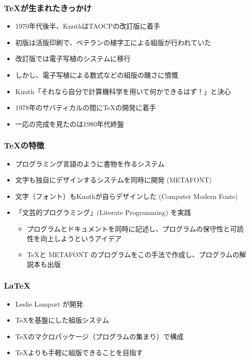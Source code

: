 \documentclass[dvipdfmx]{beamer}
\begin{document}
\begin{frame}
    \frametitle{\TeX が生まれたきっかけ \cite{tex-wikipedia}}
    \large
    \begin{itemize}
        \item<1-> 1970年代後半、KnuthはTAOCPの改訂版に着手
        \item<2-> 初版は活版印刷で、ベテランの植字工による組版が行われていた
        \item<3-> 改訂版では電子写植のシステムに移行
        \item<4-> しかし、電子写植による数式などの組版の醜さに憤慨
        \item<5-> Knuth「それなら自分で計算機科学を用いて何かできるはず！」と決心
        \item<6-> 1978年のサバティカルの間に\TeX の開発に着手
        \item<7-> 一応の完成を見たのは1980年代終盤
    \end{itemize}
\end{frame}

\begin{frame}
    \frametitle{\TeX の特徴}
    \large
    \begin{itemize}
        \item プログラミング言語のように書物を作るシステム
        \item 文字も独自にデザインするシステムを同時に開発 (METAFONT)
        \item 文字（フォント）もKnuthが自らデザインした (Computer Modern Fonts)
        \item 「文芸的プログラミング」(Literate Programming) を実践
        \begin{itemize}
            \item プログラムとドキュメントを同時に記述し、プログラムの保守性と可読性を向上しようというアイデア
            \item \TeX と METAFONT のプログラムをこの手法で作成し、プログラムの解説本も出版
        \end{itemize}
    \end{itemize}
\end{frame}

\begin{frame}
    \frametitle{\LaTeX}
    \large
    \begin{itemize}
        \item Leslie Lamport が開発
        \item \TeX を基盤にした組版システム
        \item \TeX のマクロパッケージ（プログラムの集まり）で構成
        \item \TeX よりも手軽に組版できることを目指す
    \end{itemize}
\end{frame}
\end{document}

